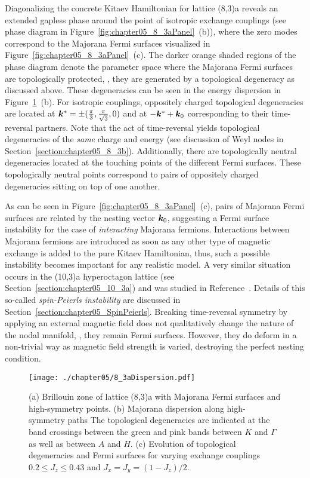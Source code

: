 Diagonalizing the concrete Kitaev Hamiltonian for lattice (8,3)a reveals an extended gapless phase around the point of isotropic exchange couplings (see phase diagram in Figure~\ref{fig:chapter05_8_3aPanel}~(b)), where the zero modes correspond to the Majorana Fermi surfaces visualized in Figure~\ref{fig:chapter05_8_3aPanel}~(c).
The darker orange shaded regions of the phase diagram denote the parameter space where the Majorana Fermi surfaces are topologically protected, \ie, they are generated by a topological degeneracy as discussed above.
These degeneracies can be seen in the energy dispersion in Figure~\ref{fig:chapter05_8_3aDispersion}~(b).
For isotropic couplings, oppositely charged topological degeneracies are located at $\bm{k}^* = \pm (\frac{\pi}{3}, \frac{\pi}{\sqrt{3}}, 0)$ and at $-\bm{k}^* + \bm{k}_0$ corresponding to their time-reversal partners.
Note that the act of time-reversal yields topological degeneracies of the \textit{same} charge and energy (see discussion of Weyl nodes in Section~\ref{section:chapter05_8_3b}).
Additionally, there are topologically neutral degeneracies located at the touching points of the different Fermi surfaces.
These topologically neutral points correspond to pairs of oppositely charged degeneracies sitting on top of one another.

As can be seen in Figure~\ref{fig:chapter05_8_3aPanel}~(c), pairs of Majorana Fermi surfaces are related by the nesting vector $\bm{k}_0$, suggesting a Fermi surface instability for the case of \textit{interacting} Majorana fermions.
Interactions between Majorana fermions are introduced as soon as any other type of magnetic exchange is added to the pure Kitaev Hamiltonian, thus, such a possible instability becomes important for any realistic model.
A very similar situation occurs in the (10,3)a hyperoctagon lattice (see Section~\ref{section:chapter05_10_3a}) and was studied in Reference~\cite{HermannsPRL2015b}.
Details of this so-called \textit{spin-Peierls instability} are discussed in Section~\ref{section:chapter05_SpinPeierls}.
Breaking time-reversal symmetry by applying an external magnetic field does not qualitatively change the nature of the nodal manifold, \ie, they remain Fermi surfaces.
However, they do deform in a non-trivial way as magnetic field strength is varied, destroying the perfect nesting condition.\newpage
%
\begin{figure}[tb]
	\centering
	\texttt{[image: ./chapter05/8\_3aDispersion.pdf]}
	\caption{
		(a) Brillouin zone of lattice (8,3)a with Majorana Fermi surfaces and high-symmetry points.
		(b) Majorana dispersion along high-symmetry paths
		The topological degeneracies are indicated at the band crossings between the green and pink bands between $K$ and $\Gamma$ as well as between $A$ and $H$.
		(c) Evolution of topological degeneracies and Fermi surfaces for varying exchange couplings $0.2 \leq J_z \leq 0.43$ and $J_x = J_y = (1 - J_z)/2$.
	}
	\label{fig:chapter05_8_3aDispersion}
\end{figure}
%


